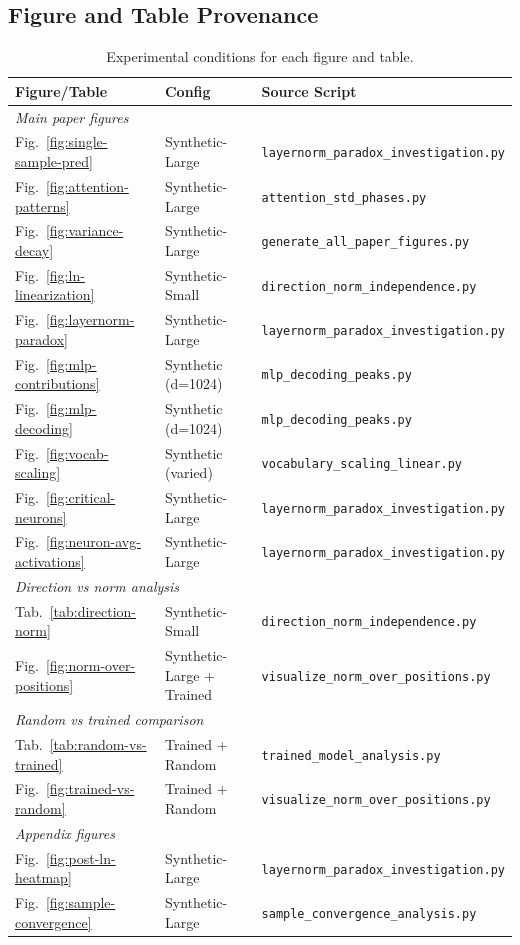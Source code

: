 \documentclass[11pt]{article}
\begin{document}
\subsection{Figure and Table Provenance}

\begin{table}[htbp]
\centering
\small
\begin{tabular}{lll}
\toprule
\textbf{Figure/Table} & \textbf{Config} & \textbf{Source Script} \\
\midrule
\multicolumn{3}{l}{\textit{Main paper figures}} \\
Fig.~\ref{fig:single-sample-pred} & Synthetic-Large & \texttt{layernorm\_paradox\_investigation.py} \\
Fig.~\ref{fig:attention-patterns} & Synthetic-Large & \texttt{attention\_std\_phases.py} \\
Fig.~\ref{fig:variance-decay} & Synthetic-Large & \texttt{generate\_all\_paper\_figures.py} \\
Fig.~\ref{fig:ln-linearization} & Synthetic-Small & \texttt{direction\_norm\_independence.py} \\
Fig.~\ref{fig:layernorm-paradox} & Synthetic-Large & \texttt{layernorm\_paradox\_investigation.py} \\
Fig.~\ref{fig:mlp-contributions} & Synthetic (d=1024) & \texttt{mlp\_decoding\_peaks.py} \\
Fig.~\ref{fig:mlp-decoding} & Synthetic (d=1024) & \texttt{mlp\_decoding\_peaks.py} \\
Fig.~\ref{fig:vocab-scaling} & Synthetic (varied) & \texttt{vocabulary\_scaling\_linear.py} \\
Fig.~\ref{fig:critical-neurons} & Synthetic-Large & \texttt{layernorm\_paradox\_investigation.py} \\
Fig.~\ref{fig:neuron-avg-activations} & Synthetic-Large & \texttt{layernorm\_paradox\_investigation.py} \\
\midrule
\multicolumn{3}{l}{\textit{Direction vs norm analysis}} \\
Tab.~\ref{tab:direction-norm} & Synthetic-Small & \texttt{direction\_norm\_independence.py} \\
Fig.~\ref{fig:norm-over-positions} & Synthetic-Large + Trained & \texttt{visualize\_norm\_over\_positions.py} \\
\midrule
\multicolumn{3}{l}{\textit{Random vs trained comparison}} \\
Tab.~\ref{tab:random-vs-trained} & Trained + Random & \texttt{trained\_model\_analysis.py} \\
Fig.~\ref{fig:trained-vs-random} & Trained + Random & \texttt{visualize\_norm\_over\_positions.py} \\
\midrule
\multicolumn{3}{l}{\textit{Appendix figures}} \\
Fig.~\ref{fig:post-ln-heatmap} & Synthetic-Large & \texttt{layernorm\_paradox\_investigation.py} \\
Fig.~\ref{fig:sample-convergence} & Synthetic-Large & \texttt{sample\_convergence\_analysis.py} \\
\bottomrule
\end{tabular}
\caption{Experimental conditions for each figure and table.}
\label{tab:figure-provenance}
\end{table}
\end{document}
